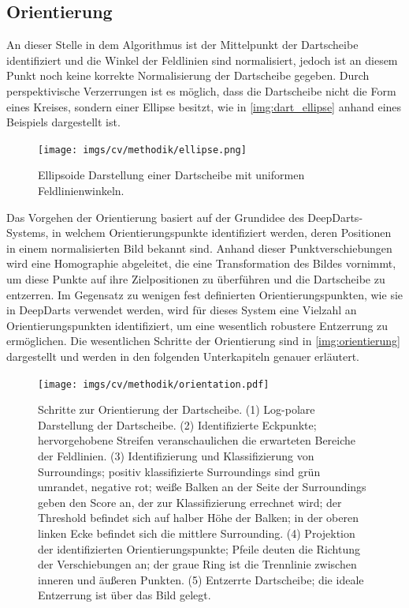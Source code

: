 \subsection{Orientierung}
\label{sec:orientierung}

An dieser Stelle in dem Algorithmus ist der Mittelpunkt der Dartscheibe identifiziert und die Winkel der Feldlinien sind normalisiert, jedoch ist an diesem Punkt noch keine korrekte Normalisierung der Dartscheibe gegeben. Durch perspektivische Verzerrungen ist es möglich, dass die Dartscheibe nicht die Form eines Kreises, sondern einer Ellipse besitzt, wie in \autoref{img:dart_ellipse} anhand eines Beispiels dargestellt ist.

\begin{figure}
    \centering
    \texttt{[image: imgs/cv/methodik/ellipse.png]}
    \caption{Ellipsoide Darstellung einer Dartscheibe mit uniformen Feldlinienwinkeln.}
    \label{img:dart_ellipse}
\end{figure}

Das Vorgehen der Orientierung basiert auf der Grundidee des DeepDarts-Systems, in welchem Orientierungspunkte identifiziert werden, deren Positionen in einem normalisierten Bild bekannt sind. Anhand dieser Punktverschiebungen wird eine Homographie abgeleitet, die eine Transformation des Bildes vornimmt, um diese Punkte auf ihre Zielpositionen zu überführen und die Dartscheibe zu entzerren. Im Gegensatz zu wenigen fest definierten Orientierungspunkten, wie sie in DeepDarts verwendet werden, wird für dieses System eine Vielzahl an Orientierungspunkten identifiziert, um eine wesentlich robustere Entzerrung zu ermöglichen. Die wesentlichen Schritte der Orientierung sind in \autoref{img:orientierung} dargestellt und werden in den folgenden Unterkapiteln genauer erläutert.

\begin{figure}
    \centering
    \texttt{[image: imgs/cv/methodik/orientation.pdf]}
    \caption{Schritte zur Orientierung der Dartscheibe. (1) Log-polare Darstellung der Dartscheibe. (2) Identifizierte Eckpunkte; hervorgehobene Streifen veranschaulichen die erwarteten Bereiche der Feldlinien. (3) Identifizierung und Klassifizierung von Surroundings; positiv klassifizierte Surroundings sind grün umrandet, negative rot; weiße Balken an der Seite der Surroundings geben den Score an, der zur Klassifizierung errechnet wird; der Threshold befindet sich auf halber Höhe der Balken; in der oberen linken Ecke befindet sich die mittlere Surrounding. (4) Projektion der identifizierten Orientierungspunkte; Pfeile deuten die Richtung der Verschiebungen an; der graue Ring ist die Trennlinie zwischen inneren und äußeren Punkten. (5) Entzerrte Dartscheibe; die ideale Entzerrung ist über das Bild gelegt.}
    \label{img:orientierung}
\end{figure}

